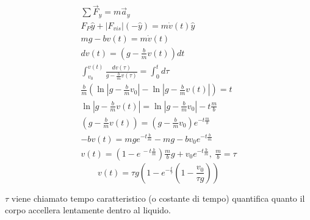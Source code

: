 \documentclass{article}
\numberwithin{equation}{subsection}
\begin{document}
\begin{center}\end{center}
 
\begin{gather*}
    \sum\vec{F}_y=m\vec{a}_y\\
    F_P\hat{y}+\left|F_{vis}\right|(-\hat{y})=m\dot v(t)\hat{y}\\
    mg-bv(t)=m\dot v(t)\\
    dv(t)=\left(g-\displaystyle\frac{b}{m}v(t)\right)dt\\
    \displaystyle\int_{v_0}^{v(t)}\frac{dv(\tau)}{g-\displaystyle\frac{b}{m}v(\tau)}=\int_{0}^{t}d\tau\\
    \displaystyle\frac{b}{m}\left(\ln\left|g-\displaystyle\frac{b}{m} v_0\right|-\ln\left|g-\displaystyle\frac{b}{m} v(t)\right|\right)=t\\
    \displaystyle \ln\left|g-\displaystyle\frac{b}{m}v(t)\right|=\ln\left|g-\displaystyle\frac{b}{m} v_0\right|-t\frac{m}{b}\\
    \left(g-\displaystyle\frac{b}{m} v(t)\right)=\left(g-\frac{b}{m}v_0\right)e^{ -t\frac{m}{b}}\\
    -bv(t)=mge^{ -t\frac{b}{m}}-mg-bv_0e^{ -t\frac{b}{m}}\\
    v(t)=\left(1-e^{\ -t\frac{b}{m}}\right)\displaystyle\frac{m}{b}g+v_0e^{ -t\frac{b}{m}},\:\frac{m}{b}=\tau
\end{gather*}
\begin{equation}
    v(t)=\tau g\left(1-e^{ -\frac{t}{\tau}}\left(1-\displaystyle\frac{v_0}{\tau g}\right)\right)
\end{equation}

$\tau$ viene chiamato tempo caratteristico (o costante di tempo) 
quantifica quanto il corpo accellera lentamente dentro al liquido. 
\end{document}
